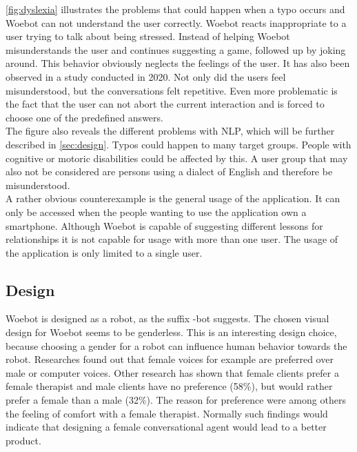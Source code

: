 \autoref{fig:dyslexia} illustrates the problems that could happen when a typo occurs and Woebot can not understand the user correctly.
Woebot reacts inappropriate to a user trying to talk about being stressed.
Instead of helping Woebot misunderstands the user and continues suggesting a game, followed up by joking around.
This behavior obviously neglects the feelings of the user.
It has also been observed in a study conducted in 2020\cite{investigating-students}.
Not only did the users feel misunderstood, but the conversations felt repetitive.
Even more problematic is the fact that the user can not abort the current interaction and is forced to choose one of the predefined answers.\\

The figure also reveals the different problems with NLP, which will be further described in \autoref{sec:design}.
Typos could happen to many target groups.
People with cognitive or motoric disabilities could be affected by this.
A user group that may also not be considered are persons using a dialect of English and therefore be misunderstood.\\

A rather obvious counterexample is the general usage of the application.
It can only be accessed when the people wanting to use the application own a smartphone.
Although Woebot is capable of suggesting different lessons for relationships it is not capable for usage with more than one user.
The usage of the application is only limited to a single user.\\




\subsection{Design}\label{sec:design}
Woebot is designed as a robot, as the suffix -bot suggests.
The chosen visual design for Woebot seems to be genderless.
This is an interesting design choice, because choosing a gender for a robot can influence human behavior towards the robot.
Researches found out that female voices for example are preferred over male or computer voices\cite{bias-robot}. 
Other research has shown that female clients prefer a female therapist and male clients have no preference (58\%), but would rather prefer a female than a male (32\%)\cite{client-gender-preference}.
The reason for preference were among others the feeling of comfort with a female therapist.
Normally such findings would indicate that designing a female conversational agent would lead to a better product.\\

